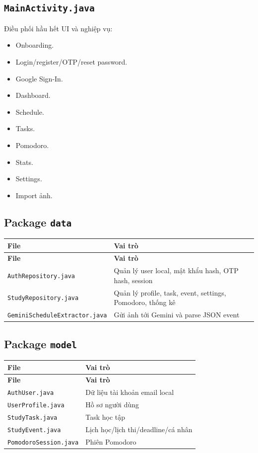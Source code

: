 \documentclass[12pt,a4paper]{report}
\begin{document}
\subsection{\texttt{MainActivity.java}}

Điều phối hầu hết UI và nghiệp vụ:

\begin{itemize}
\item Onboarding.
\item Login/register/OTP/reset password.
\item Google Sign-In.
\item Dashboard.
\item Schedule.
\item Tasks.
\item Pomodoro.
\item Stats.
\item Settings.
\item Import ảnh.
\end{itemize}

\subsection{Package \texttt{data}}

\begin{longtable}{|>{\raggedright\arraybackslash}p{}|>{\raggedright\arraybackslash}p{}|}
\hline
\textbf{File} & \textbf{Vai trò} \\ \hline
\endfirsthead
\hline
\textbf{File} & \textbf{Vai trò} \\ \hline
\endhead
\texttt{AuthRepository.java} & Quản lý user local, mật khẩu hash, OTP hash, session \\ \hline
\texttt{StudyRepository.java} & Quản lý profile, task, event, settings, Pomodoro, thống kê \\ \hline
\texttt{GeminiScheduleExtractor.java} & Gửi ảnh tới Gemini và parse JSON event \\ \hline
\end{longtable}

\subsection{Package \texttt{model}}

\begin{longtable}{|>{\raggedright\arraybackslash}p{}|>{\raggedright\arraybackslash}p{}|}
\hline
\textbf{File} & \textbf{Vai trò} \\ \hline
\endfirsthead
\hline
\textbf{File} & \textbf{Vai trò} \\ \hline
\endhead
\texttt{AuthUser.java} & Dữ liệu tài khoản email local \\ \hline
\texttt{UserProfile.java} & Hồ sơ người dùng \\ \hline
\texttt{StudyTask.java} & Task học tập \\ \hline
\texttt{StudyEvent.java} & Lịch học/lịch thi/deadline/cá nhân \\ \hline
\texttt{PomodoroSession.java} & Phiên Pomodoro \\ \hline
\end{longtable}
\end{document}
